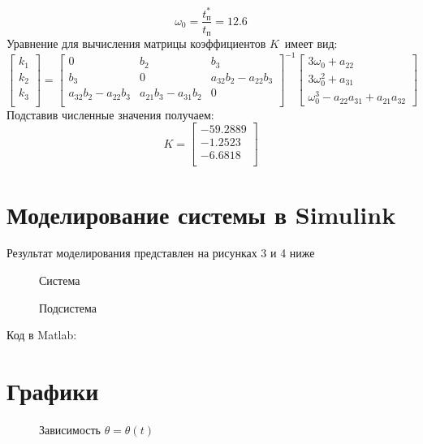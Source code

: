 \documentclass[a4paper]{article}
\begin{document}
\begin{flushleft}
\begin{equation*}
    \omega_0 = \frac{t_{\text{п}}^{*}}{t_{\text{п}}} = 12.6
\end{equation*}
Уравнение для вычисления матрицы коэффициентов \(K\)\ имеет вид:
\begin{equation*}
    \begin{bmatrix}
    k_1\\
    k_2\\
    k_3\\
    \end{bmatrix}
    =
    \begin{bmatrix}
    0 & b_2 & b_3\\
    b_3 & 0 & a_{32}b_{2} - a_{22}b_{3}\\
     a_{32}b_{2} - a_{22}b_{3} &  a_{21}b_{3} - a_{31}b_{2} & 0\\
    \end{bmatrix}^{-1}
    \begin{bmatrix}
    3\omega_0 + a_{22}\\
    3\omega_0^2 + a_{31}\\
    \omega_0^3 - a_{22}a_{31} + a_{21}a_{32}
    \end{bmatrix}
\end{equation*}
Подставив численные значения получаем:
\begin{equation*}
K=
    \begin{bmatrix}
    -59.2889 \\
   -1.2523 \\
   -6.6818 \\
    \end{bmatrix}
\end{equation*}
\section{Моделирование системы в Simulink}
Результат моделирования представлен на рисунках 3 и 4 ниже

\begin{figure} [H]
    \caption{Система}
\end{figure}

\begin{figure}[H]
    \caption{Подсистема}
\end{figure}

Код в Matlab:



\section{Графики }
\begin{figure} [H]
    \caption{Зависимость \(\theta = \theta(t)\)\ }
\end{figure}


\end{flushleft}
\end{document}
